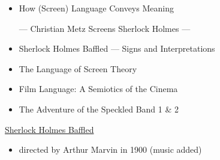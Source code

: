 \documentclass[a4paper,landscape,headrule,footrule,xetex]{foils}
\begin{document}
\makexeCJKinactive
\renewcommand{\avmvalfont}{\it}
\maketitle


\begin{itemize}
\item How (Screen) Language
  Conveys Meaning
  \begin{center}
  — Christian Metz Screens Sherlock Holmes  —
      \end{center}
\item 
Sherlock Holmes Baffled — Signs and
Interpretations
\item 
The Language of Screen Theory
\item Film Language: A Semiotics of the Cinema
\item The Adventure of the Speckled Band 1 \& 2
\end{itemize}

\href{https://www.youtube.com/watch?v=HYN4QzX9-EM}{Sherlock Holmes Baffled}

\begin{itemize} 
\item directed by Arthur Marvin in 1900 (music added)
\end{itemize}

\end{document}
